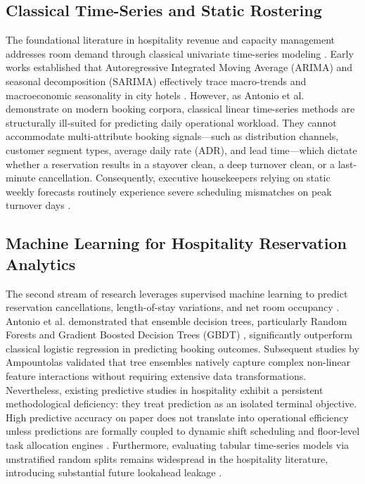 \documentclass[11pt,a4paper]{article}
\begin{document}
\subsection{Classical Time-Series and Static Rostering}
The foundational literature in hospitality revenue and capacity management addresses room demand through classical univariate time-series modeling \cite{weatherford2003,pullman2002}. Early works established that Autoregressive Integrated Moving Average (ARIMA) and seasonal decomposition (SARIMA) effectively trace macro-trends and macroeconomic seasonality in city hotels \cite{song2019,ampountolas2021}. However, as Antonio et al. \cite{antonio2019bigdata} demonstrate on modern booking corpora, classical linear time-series methods are structurally ill-suited for predicting daily operational workload. They cannot accommodate multi-attribute booking signals---such as distribution channels, customer segment types, average daily rate (ADR), and lead time---which dictate whether a reservation results in a stayover clean, a deep turnover clean, or a last-minute cancellation. Consequently, executive housekeepers relying on static weekly forecasts routinely experience severe scheduling mismatches on peak turnover days \cite{guerrier1989,chan2013}.

\subsection{Machine Learning for Hospitality Reservation Analytics}
The second stream of research leverages supervised machine learning to predict reservation cancellations, length-of-stay variations, and net room occupancy \cite{antonio2017,law2019}. Antonio et al. \cite{antonio2017,antonio2019bigdata} demonstrated that ensemble decision trees, particularly Random Forests \cite{breiman2001} and Gradient Boosted Decision Trees (GBDT) \cite{chen2016}, significantly outperform classical logistic regression in predicting booking outcomes. Subsequent studies by Ampountolas \cite{ampountolas2026} validated that tree ensembles natively capture complex non-linear feature interactions without requiring extensive data transformations. Nevertheless, existing predictive studies in hospitality exhibit a persistent methodological deficiency: they treat prediction as an isolated terminal objective. High predictive accuracy on paper does not translate into operational efficiency unless predictions are formally coupled to dynamic shift scheduling and floor-level task allocation engines \cite{sainaghi2019}. Furthermore, evaluating tabular time-series models via unstratified random splits remains widespread in the hospitality literature, introducing substantial future lookahead leakage \cite{antonio2019,ampountolas2026}.
\end{document}
